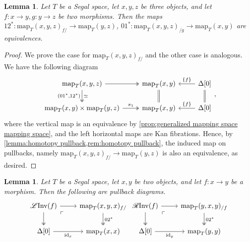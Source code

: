 \documentclass[11pt, a4paper]{amsart}
\newcommand{\map}{\mathrm{map}}
\newcommand{\id}{\mathrm{id}}
\newcommand{\LInv}{\mathscr{L}\mathrm{Inv}}
\newcommand{\RInv}{\mathscr{R}\mathrm{Inv}}
\newtheorem{lemma}[equation]{Lemma}
\theoremstyle{definition}
\theoremstyle{remark}
\numberwithin{equation}{section}
\begin{document}
\begin{lemma} \label{lemma:map xyz f g}
 Let $T$ be a Segal space, let $x,y,z$ be three objects, and let $f\colon x \to y, g\colon y \to z$ be two morphisms. Then the maps $12^*\colon\map_T(x,y,z)_{f/} \to \map_T(y,z)$, $01^*\colon\map_T(x,y,z)_{/g} \to \map_T(x,y)$ are equivalences.
\end{lemma}

\begin{proof}
  We prove the case for $\map_T(x,y,z)_{f/}$ and the other case is analogous. We have the following diagram
  \[
  \begin{tikzcd}
    \map_T(x,y,z) \arrow[r, twoheadrightarrow] \arrow[d, "\simeq", "{(01^*,12^*)}"', twoheadrightarrow] & \map_T(x,y) \arrow[d, equal] & \Delta[0] \arrow[l, "\{f\}"'] \arrow[d, equal] \\
    \map_T(x,y) \times \map_T(y,z) \arrow[r, "\pi_1", twoheadrightarrow] & \map_T(x,y) & \Delta[0] \arrow[l, "\{f\}"']
  \end{tikzcd},
  \]
  where the vertical map is an equivalence by \cref{prop:generalized mapping space mapping space}, and the left horizontal maps are Kan fibrations. Hence, by \cref{lemma:homotopy pullback,rem:homotopy pullback}, the induced map on pullbacks, namely $\map_T(x,y,z)_{f/} \to \map_T(y,z)$ is also an equivalence, as desired.
\end{proof}

\begin{lemma} \label{lemma:linv rinv fiber}
 Let $T$ be a Segal space, let $x,y$ be two objects, and let $f\colon x \to y$ be a morphism. Then the following are pullback diagrams.
\[
\begin{tikzcd}
\LInv(f) \arrow[r] \arrow[d, twoheadrightarrow] \arrow[dr, phantom, "\ulcorner", very near start] & \map_T(x,y,x)_{f/} \arrow[d, "02^*", twoheadrightarrow] \\
\Delta[0] \arrow[r, "{\id_x}"'] & \map_T(x,x)
\end{tikzcd}
\begin{tikzcd}
\RInv(f) \arrow[r] \arrow[d, twoheadrightarrow] \arrow[dr, phantom, "\ulcorner", very near start] & \map_T(y,x,y)_{/f} \arrow[d, "02^*", twoheadrightarrow] \\
\Delta[0] \arrow[r, "{\id_y}"'] & \map_T(y,y)
\end{tikzcd}
\]
\end{lemma}
\end{document}

